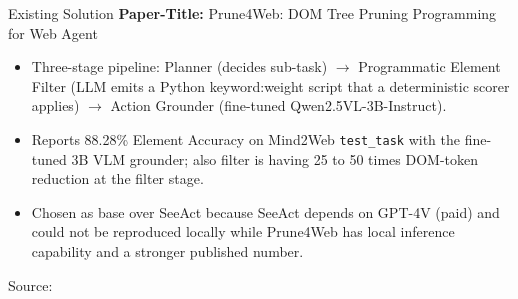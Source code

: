 \begin{frame}{Existing Solution}
  \textbf{Paper-Title:} Prune4Web: DOM Tree Pruning Programming for Web Agent

  \begin{itemize}
    \item Three-stage pipeline: Planner (decides sub-task) $\to$ Programmatic Element Filter (LLM emits a Python keyword:weight script that a deterministic scorer applies) $\to$ Action Grounder (fine-tuned Qwen2.5VL-3B-Instruct).
    \item Reports 88.28\% Element Accuracy on Mind2Web \texttt{test\_task} with the fine-tuned 3B VLM grounder; also filter is having 25 to 50 times DOM-token reduction at the filter stage.
    \item Chosen as base over SeeAct because SeeAct depends on GPT-4V (paid) and could not be reproduced locally while Prune4Web has local inference capability and a stronger published number.
  \end{itemize}

  \vfill
  \hfill{\footnotesize Source: \cite{SeeAct, zhang2025prune4web}}
\end{frame}
